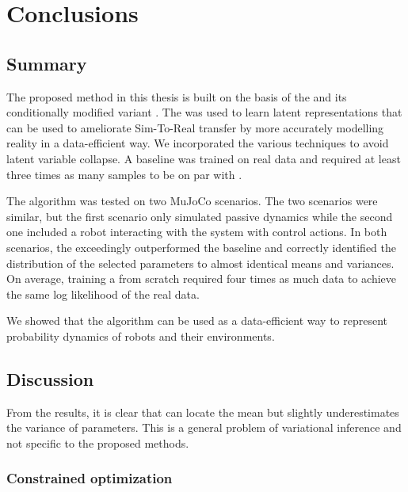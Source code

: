 \chapter{Conclusions}
\label{conclusions}

\section{Summary}

The proposed method in this thesis is built on the basis of the \vae{} and its conditionally modified variant \cvae{}. The \cvae{} was used to learn latent representations that can be used to ameliorate Sim-To-Real transfer by more accurately modelling reality in a data-efficient way. We incorporated the various techniques to avoid latent variable collapse. A baseline \cvae{} was trained on real data and required at least three times as many samples to be on par with \dettostoc{}.

The \dettostoc{} algorithm was tested on two MuJoCo scenarios. The two scenarios were similar, but the first scenario only simulated passive dynamics while the second one included a robot interacting with the system with control actions. In both scenarios, the \dettostoc{} exceedingly outperformed the baseline and correctly identified the distribution of the selected parameters to almost identical means and variances. On average, training a \cvae{} from scratch required four times as much data to achieve the same log likelihood of the real data.

We showed that the \dettostoc{} algorithm can be used as a data-efficient way to represent probability dynamics of robots and their environments.

\section{Discussion}

From the results, it is clear that \dettostoc{} can locate the mean but slightly underestimates the variance of parameters. This is a general problem of variational inference \parencite{bishop:2006:PRML} and not specific to the proposed methods.

\subsection{Constrained optimization}

